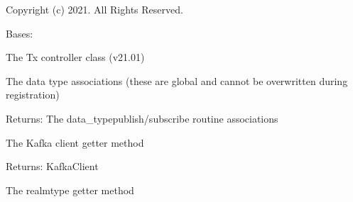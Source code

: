 \documentclass[letterpaper,10pt,english]{sphinxmanual}
\begin{document}
\sphinxAtStartPar
Copyright (c) 2021. All Rights Reserved.

\begin{fulllineitems}
\label{\detokenize{TxRealm:TxRealm.TxController}}
\sphinxAtStartPar
Bases: {\hyperref[\detokenize{Forge:Forge.Controller}]{}}

\sphinxAtStartPar
The Tx controller class (v21.01)

\begin{fulllineitems}
\label{\detokenize{TxRealm:TxRealm.TxController.data_type_associations}}
\sphinxAtStartPar
The data type associations (these are global and cannot be overwritten during registration)

\sphinxAtStartPar
Returns: The data\_type\sphinxhyphen{}publish/subscribe routine associations

\end{fulllineitems}


\begin{fulllineitems}
\label{\detokenize{TxRealm:TxRealm.TxController.kafka_client}}
\sphinxAtStartPar
The Kafka client getter method

\sphinxAtStartPar
Returns: KafkaClient

\end{fulllineitems}


\begin{fulllineitems}
\label{\detokenize{TxRealm:TxRealm.TxController.realm}}
\sphinxAtStartPar
The realm\sphinxhyphen{}type getter method


\end{fulllineitems}
\end{fulllineitems}
\end{document}
